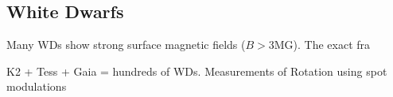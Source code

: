 {\color{red} \subsection{White Dwarfs}}
Many WDs show strong surface magnetic fields ($B>$3MG). The exact fra

K2 + Tess + Gaia = hundreds of WDs. Measurements of Rotation using spot modulations